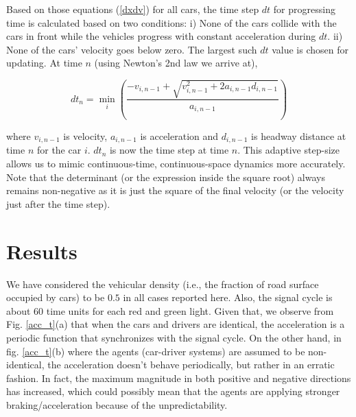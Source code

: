\documentclass[conference]{IEEEtran}
\begin{document}
Based on those equations (\ref{dxdv}) for all cars, the time step $dt$ for progressing time is calculated based on two conditions: i) None of the cars collide with the cars in front while the vehicles progress with constant acceleration during $dt$. ii) None of the cars' velocity goes below zero. The largest such $dt$ value is chosen for updating. At time $n$ (using Newton's 2nd law we arrive at),

\begin{equation}
    dt_{n} = \min_{i}\left( \frac{-v_{i,n-1} + \sqrt{v_{i,n-1}^2 + 2a_{i,n-1}d_{i,n-1}}}{a_{i,n-1}}\right)
\end{equation}

where $v_{i,n-1}$ is velocity, $a_{i,n-1}$ is acceleration and $d_{i,n-1}$ is headway distance at time $n$ for the car $i$. $dt_{n}$ is now the time step at time $n$. This adaptive step-size allows us to mimic continuous-time, continuous-space dynamics more accurately. Note that the determinant (or the expression inside the square root) always remains non-negative as it is just the square of the final velocity (or the velocity just after the time step).

\section{Results}

We have considered the vehicular density (i.e., the fraction of road surface occupied by cars) to be $0.5$ in all cases reported here. Also, the signal cycle is about 60 time units for each red and green light. Given that, we observe from Fig. \ref{acc_t}(a) that when the cars and drivers are identical, the acceleration is a periodic function that synchronizes with the signal cycle. On the other hand, in fig. \ref{acc_t}(b) where the agents (car-driver systems) are assumed to be non-identical, the acceleration doesn't behave periodically, but rather in an erratic fashion. In fact, the maximum magnitude in both positive and negative directions has increased, which could possibly mean that the agents are applying stronger braking/acceleration because of the unpredictability. %
\end{document}
